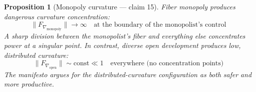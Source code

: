 \documentclass[11pt,a4paper]{article}
\newtheorem{proposition}[definition]{Proposition}
\begin{document}
\begin{proposition}[Monopoly curvature --- claim 15]
\label{prop:monopoly_curv}
Fiber monopoly produces dangerous curvature concentration:
\[
  \|F_{\nabla_{\text{monopoly}}}\| \to \infty \quad
  \text{at the boundary of the monopolist's control}
\]
A sharp division between the monopolist's fiber and everything else
concentrates power at a singular point. In contrast, diverse open
development produces low, distributed curvature:
\[
  \|F_{\nabla_{\text{open}}}\| \sim \text{const} \ll 1 \quad
  \text{everywhere (no concentration points)}
\]
The manifesto argues for the distributed-curvature configuration as
both safer and more productive.
\end{proposition}
\end{document}
